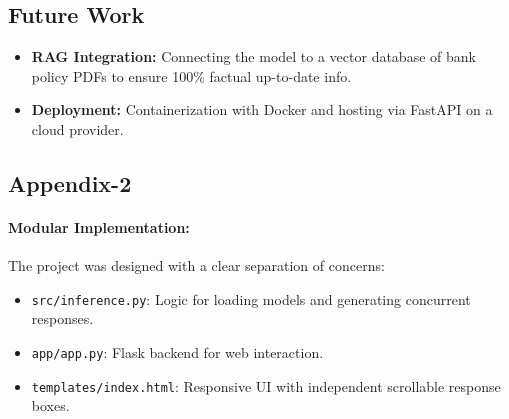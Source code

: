 \documentclass[12pt,a4paper]{article}
\begin{document}
\subsection{Future Work}
\begin{itemize}
    \item \textbf{RAG Integration:} Connecting the model to a vector database of bank policy PDFs to ensure 100\% factual up-to-date info.
    \item \textbf{Deployment:} Containerization with Docker and hosting via FastAPI on a cloud provider.
\end{itemize}

\subsection{Appendix-2}
\paragraph{Modular Implementation:}
The project was designed with a clear separation of concerns:
\begin{itemize}
    \item \texttt{src/inference.py}: Logic for loading models and generating concurrent responses.
    \item \texttt{app/app.py}: Flask backend for web interaction.
    \item \texttt{templates/index.html}: Responsive UI with independent scrollable response boxes.
\end{itemize}
\end{document}
